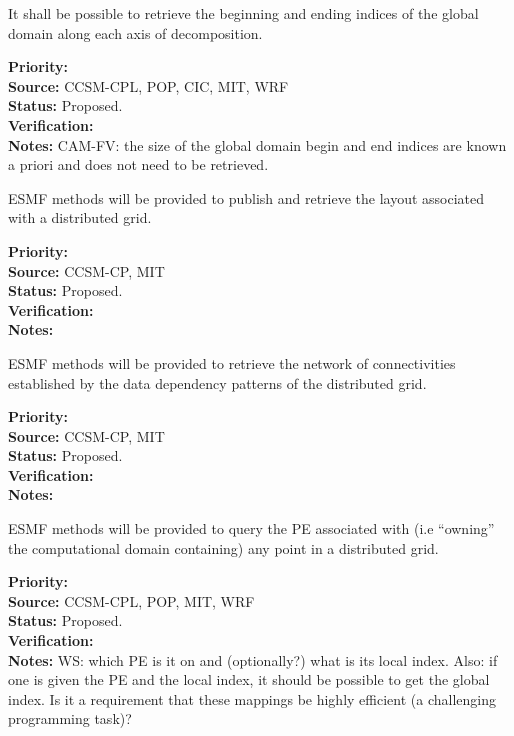 
It shall be possible to retrieve the beginning and ending indices of the
global domain along each axis of decomposition.

\begin{reqlist}
{\bf Priority:} \\
{\bf Source:} CCSM-CPL, POP, CIC, MIT, WRF \\
{\bf Status:} Proposed. \\
{\bf Verification:} \\
{\bf Notes:} CAM-FV: the size of the global domain begin and end
indices are known a priori and does not need to be retrieved.
\end{reqlist}


ESMF methods will be provided to publish and retrieve the layout
associated with a distributed grid.

\begin{reqlist}
{\bf Priority:} \\
{\bf Source:} CCSM-CP, MIT \\
{\bf Status:} Proposed. \\
{\bf Verification:} \\
{\bf Notes:}
\end{reqlist}


ESMF methods will be provided to retrieve the network of
connectivities established by the data dependency patterns of the
distributed grid.

\begin{reqlist}
{\bf Priority:} \\
{\bf Source:} CCSM-CP, MIT \\
{\bf Status:} Proposed. \\
{\bf Verification:} \\
{\bf Notes:}
\end{reqlist}


ESMF methods will be provided to query the PE associated with (i.e
``owning'' the computational domain containing) any point in a
distributed grid.

\begin{reqlist}
{\bf Priority:} \\ 
{\bf Source:} CCSM-CPL, POP, MIT, WRF \\
{\bf Status:} Proposed. \\
{\bf Verification:} \\
{\bf Notes:} WS: which PE is it on and (optionally?) what 
is its local index.  Also: if one is given the PE and the local index, 
it should be possible to get the global index.  Is it a requirement that
these mappings be highly efficient (a challenging programming task)?
\end{reqlist}

